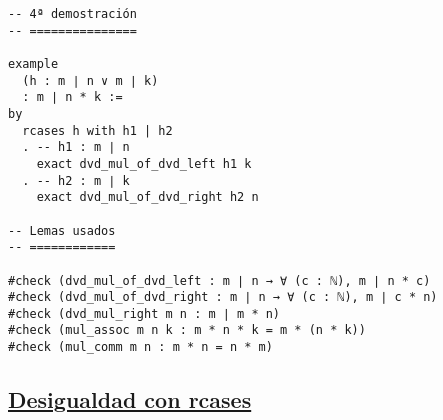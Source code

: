 \begin{verbatim}
-- 4ª demostración
-- ===============

example
  (h : m ∣ n ∨ m ∣ k)
  : m ∣ n * k :=
by
  rcases h with h1 | h2
  . -- h1 : m ∣ n
    exact dvd_mul_of_dvd_left h1 k
  . -- h2 : m ∣ k
    exact dvd_mul_of_dvd_right h2 n

-- Lemas usados
-- ============

#check (dvd_mul_of_dvd_left : m ∣ n → ∀ (c : ℕ), m ∣ n * c)
#check (dvd_mul_of_dvd_right : m ∣ n → ∀ (c : ℕ), m ∣ c * n)
#check (dvd_mul_right m n : m ∣ m * n)
#check (mul_assoc m n k : m * n * k = m * (n * k))
#check (mul_comm m n : m * n = n * m)
\end{verbatim}

\subsection{\href{./src/Logica/Desigualdad\_con\_rcases.lean}{Desigualdad con rcases}}
\label{sec:org8ee832b}
